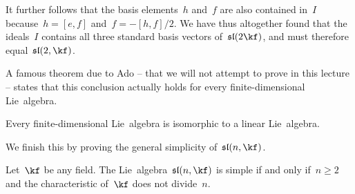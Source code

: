 \begin{examples}
\begin{enumerate}
			It further follows that the basis elements~$h$ and~$f$ are also contained in~$I$ because~$h = [e,f]$ and~$f = -[h,f]/2$.
			We have thus altogether found that the ideals~$I$ contains all three standard basis vectors of~$\sllie(2 \kf)$, and must therefore equal~$\sllie(2, \kf)$.
	\end{enumerate}
\end{examples}


\begin{fluff}
	A famous theorem due to Ado -- that we will not attempt to prove in this lecture -- states that this conclusion actually holds for every finite-dimensional Lie~algebra.
\end{fluff}


\begin{theorem}
	\label{Ado’s theorem}
	Every finite-dimensional Lie~algebra is isomorphic to a linear Lie~algebra.
\end{theorem}


\begin{fluff}
	We finish this  by proving the general simplicity of~$\sllie(n, \kf)$.
\end{fluff}


\begin{theorem}
	\label{sln is simple}
	Let~$\kf$ be any field.
	The Lie~algebra~$\sllie(n, \kf)$ is simple if and only if~$n \geq 2$ and the characteristic of~$\kf$ does not divide~$n$.
\end{theorem}


